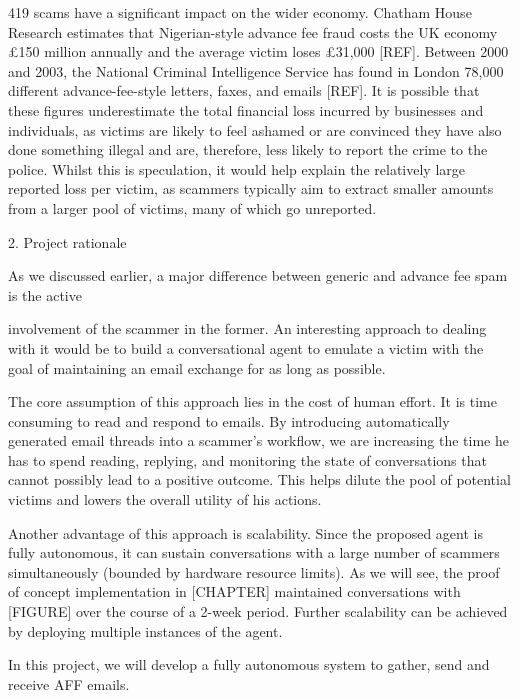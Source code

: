 419 scams have a significant impact on the wider economy. Chatham House Research estimates that Nigerian-style advance fee fraud costs the UK economy £150 million annually and the average victim loses £31,000 [REF]. Between 2000 and 2003, the National Criminal Intelligence Service has found in London 78,000 different advance-fee-style letters, faxes, and emails [REF]. It is possible that these figures underestimate the total financial loss incurred by businesses and individuals, as victims are likely to feel ashamed or are convinced they have also done something illegal and are, therefore, less likely to report the crime to the police. Whilst this is speculation, it would help explain the relatively large reported loss per victim, as scammers typically aim to extract smaller amounts from a larger pool of victims, many of which go unreported.

2.	Project rationale

As we discussed earlier, a major difference between generic and advance fee spam is the active 

involvement of the scammer in the former. An interesting approach to dealing with it would be to build a conversational agent to emulate a victim with the goal of maintaining an email exchange for as long as possible.

The core assumption of this approach lies in the cost of human effort. It is time consuming to read and respond to emails. By introducing automatically generated email threads into a scammer's workflow, we are increasing the time he has to spend reading, replying, and monitoring the state of conversations that cannot possibly lead to a positive outcome. This helps dilute the pool of potential victims and lowers the overall utility of his actions.

Another advantage of this approach is scalability. Since the proposed agent is fully autonomous, it can sustain conversations with a large number of scammers simultaneously (bounded by hardware resource limits). As we will see, the proof of concept implementation in [CHAPTER] maintained conversations with [FIGURE] over the course of a 2-week period. Further scalability can be achieved by deploying multiple instances of the agent.

In this project, we will develop a fully autonomous system to gather, send and receive AFF emails.


